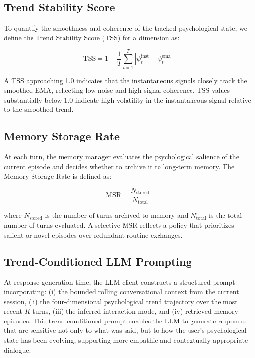 \documentclass[conference]{IEEEtran}
\begin{document}
\subsection{Trend Stability Score}

To quantify the smoothness and coherence of the tracked psychological state, we define the Trend Stability Score (TSS) for a dimension as:

\begin{equation}
\text{TSS} = 1 - \frac{1}{T} \sum_{t=1}^{T} |\psi^{\text{inst}}_t - \psi^{\text{ema}}_t|
\label{eq:tss}
\end{equation}

A TSS approaching 1.0 indicates that the instantaneous signals closely track the smoothed EMA, reflecting low noise and high signal coherence. TSS values substantially below 1.0 indicate high volatility in the instantaneous signal relative to the smoothed trend.

\subsection{Memory Storage Rate}

At each turn, the memory manager evaluates the psychological salience of the current episode and decides whether to archive it to long-term memory. The Memory Storage Rate is defined as:

\begin{equation}
\text{MSR} = \frac{N_{\text{stored}}}{N_{\text{total}}}
\label{eq:msr}
\end{equation}

where $N_{\text{stored}}$ is the number of turns archived to memory and $N_{\text{total}}$ is the total number of turns evaluated. A selective MSR reflects a policy that prioritizes salient or novel episodes over redundant routine exchanges.

\subsection{Trend-Conditioned LLM Prompting}

At response generation time, the LLM client constructs a structured prompt incorporating: (i) the bounded rolling conversational context from the current session, (ii) the four-dimensional psychological trend trajectory over the most recent $K$ turns, (iii) the inferred interaction mode, and (iv) retrieved memory episodes. This trend-conditioned prompt enables the LLM to generate responses that are sensitive not only to what was said, but to how the user's psychological state has been evolving, supporting more empathic and contextually appropriate dialogue.
\end{document}
